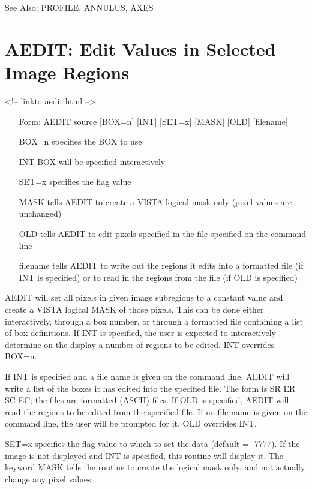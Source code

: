 See Also: PROFILE, ANNULUS, AXES

\section{AEDIT: Edit Values in Selected Image Regions}
\begin{rawhtml}
<!-- linkto aedit.html -->
\end{rawhtml}
\begin{itemize}
  \item[Form: AEDIT source {[BOX=n]} {[INT]} {[SET=x]} {[MASK]} {[OLD]} 
       {[filename]}\hfill]{}
  \item[BOX=n]{specifies the BOX to use}
  \item[INT]{BOX will be specified interactively}
  \item[SET=x]{specifies the flag value}
  \item[MASK]{tells AEDIT to create a VISTA logical mask only (pixel values
       are unchanged)}
  \item[OLD]{tells AEDIT to edit pixels specified in the file specified on
       the command line}
  \item[filename]{tells AEDIT to write out the regions it edits into a
       formatted file (if INT is specified) or to read in the regions from
       the file (if OLD is specified)}
\end{itemize}

AEDIT will set all pixels in given image subregions to a constant value and
create a VISTA logical MASK of those pixels.  This can be done either
interactively, through a box number, or through a formatted file containing
a list of box definitions.  If INT is specified, the user is expected to
interactively determine on the display a number of regions to be edited.
INT overrides BOX=n.  

If INT is specified and a file name is given on the command line, AEDIT
will write a list of the boxes it has edited into the specified file.  The
form is SR ER SC EC; the files are formatted (ASCII) files.  If OLD is
specified, AEDIT will read the regions to be edited from the specified
file.  If no file name is given on the command line, the user will be
prompted for it.  OLD overrides INT.

SET=x specifies the flag value to which to set the data (default = -7777).
If the image is not displayed and INT is specified, this routine will
display it.  The keyword MASK tells the routine to create the logical mask
only, and not actually change any pixel values.


